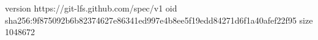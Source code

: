version https://git-lfs.github.com/spec/v1
oid sha256:9f875092b6b82374627e86341ed997e4b8ee5f19edd84271d6f1a40afef22f95
size 1048672
